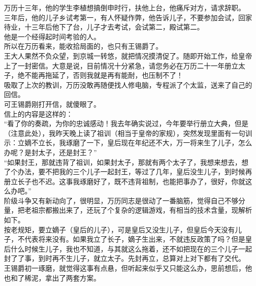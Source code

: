 \begin{multicols}{\theparacolNo}
万历十三年，他的学生李植想搞倒申时行，扶他上台，他痛斥对方，请求辞职。\\

三年后，他的儿子乡试考第一，有人怀疑作弊，他告诉儿子，不要参加会试，回家待业，十三年后他下了台，儿子才去考试，会试第二，殿试第二。\\

他是一个经得起时间考验的人。\\

所以在万历看来，能收拾局面的，也只有王锡爵了。\\

王大人果然不负众望，到京城一转悠，就把情况摸清促了。随即开始工作，给皇帝上了一封密信。大意是说，目前情况十分紧急，请您务必在万历二十一年册立太子，绝不能再拖延了，否则我就是再有能耐，也压制不了！\\

吸取了上次的教训，万历没敢再随便找人修电脑，专程派了个太监，送来了自己的回信。\\

可王锡爵刚打开信，就傻眼了。\\

信上的内容是这样的：\\

“看了你的奏疏，为你的忠诚感动！我去年确实说过，今年要举行册立大典，但是（注意此处），我昨天晚上读了祖训（相当于皇帝的家规），突然发现里面有一句训示：立嫡不立长，我琢磨了一下，皇后现在年纪还不大，万一将来生了儿子，怎么办呢？是封太子，还是封王？”\\

“如果封王，那就违背了祖训，如果封太子，那就有两个太子了，我想来想去，想了个办法，要不把我的三个儿子一起封王，等过了几年，皇后没生儿子，到时候再册立长子也不迟。这事我琢磨好了，既不违背祖制，也能把事办了，很好，你就这么办吧。”\\

阶级斗争又有新动向了，很明显，万历同志是很动了一番脑筋，觉得自己不够分量，把老祖宗都搬出来了，还玩了个复杂的逻辑游戏，有相当的技术含量，现解析如下。\\

按老规矩，要立嫡子（皇后的儿子），可是皇后又没生儿子，但皇后今天没有儿子，不代表将来没有。如果我立了长子，嫡子生出来，不就违反政策了吗？但是皇后什么时候生儿子，我也不知道，与其就这么拖着，还不如把现在的三个儿子一起封了了事，到时再不生儿子，就立太子。先封再立，总算对上对下都有了交代。\\

王锡爵初一琢磨，就觉得这事有点悬，但听起来似乎又只能这么办，思前想后，他也和了稀泥，拿出了两套方案。\\


\end{multicols}
